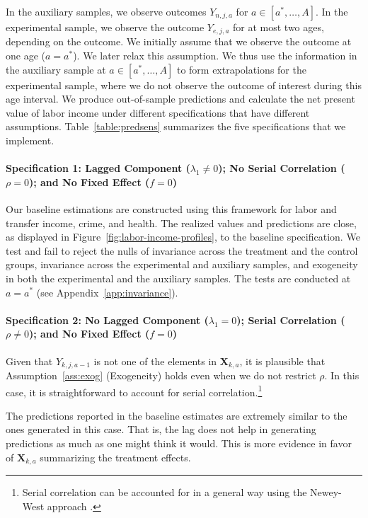 In the auxiliary samples, we observe outcomes $Y_{n,j,a}$ for $a \in [a^*, \ldots, A]$. In the experimental sample, we observe the outcome $Y_{e,j,a}$ for at most two ages, depending on the outcome. We initially assume that we observe the outcome at one age ($a = a^*$). We later relax this assumption. We thus use the information in the auxiliary sample at  $a \in [a^*, \ldots, A]$ to form extrapolations for the experimental sample, where we do not observe the outcome of interest during this age interval. We produce out-of-sample predictions and calculate the net present value of labor income under different specifications that have different assumptions. Table~\ref{table:predsens} summarizes the five specifications that we implement.

\paragraph{Specification 1: Lagged Component ($\lambda_{1} \neq 0$); No Serial Correlation ($\rho = 0$); and No Fixed Effect ($f = 0$)} \label{app:spec1}

Our baseline estimations are constructed using this framework for labor and transfer income, crime, and health. The realized values and predictions are close, as displayed in Figure~\ref{fig:labor-income-profiles}, to the baseline specification. We test and fail to reject the nulls of invariance across the treatment and the control groups, invariance across the experimental and auxiliary samples, and exogeneity in both the experimental and the auxiliary samples.  The tests are conducted at $a = a^*$ (see Appendix~\ref{app:invariance}).

\paragraph{Specification 2: No Lagged Component ($\lambda_{1} = 0$); Serial Correlation ($\rho \neq 0$); and No Fixed Effect ($f = 0$)} \label{app:spec2}

Given that $Y_{k,j,a-1}$ is not one of the elements in $\bm{X}_{k,a}$, it is plausible that Assumption~\ref{ass:exog} (Exogeneity) holds even when we do not restrict $\rho$. In this case, it is straightforward to account for serial correlation.\footnote{Serial correlation can be accounted for in a general way using the Newey-West approach \citep{Newey-West_1986_Simple-Pos}.}

The predictions reported in the baseline estimates are extremely similar to the ones generated in this case. That is, the lag does not help in generating predictions as much as one might think it would. This is more evidence in favor of $\bm{X}_{k,a}$ summarizing the treatment effects.

